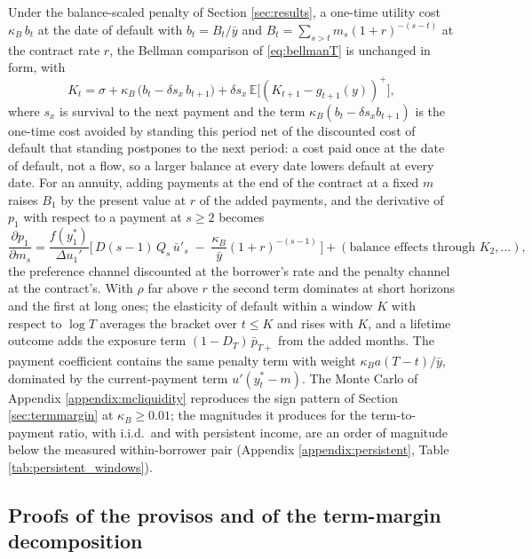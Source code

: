 \documentclass[12pt,english]{article}
\begin{document}
Under the balance-scaled penalty of Section \ref{sec:results}, a one-time utility cost $\kappa_B\, b_t$ at the date of default with $b_t = B_t/\bar y$ and $B_t = \sum_{s>t} m_s (1+r)^{-(s-t)}$ at the contract rate $r$, the Bellman comparison of \eqref{eq:bellmanT} is unchanged in form, with
\begin{equation}
K_t = \sigma + \kappa_B\,\big(b_t - \delta s_x\, b_{t+1}\big) + \delta s_x\,\mathbb{E}\big[(K_{t+1} - g_{t+1}(y))^+\big],
\end{equation}
where $s_x$ is survival to the next payment and the term $\kappa_B(b_t - \delta s_x b_{t+1})$ is the one-time cost avoided by standing this period net of the discounted cost of default that standing postpones to the next period: a cost paid once at the date of default, not a flow, so a larger balance at every date lowers default at every date. For an annuity, adding payments at the end of the contract at a fixed $m$ raises $B_1$ by the present value at $r$ of the added payments, and the derivative of $p_1$ with respect to a payment at $s \ge 2$ becomes
\begin{equation}\label{eq:twochannel}
\frac{\partial p_1}{\partial m_s} = \frac{f(y_1^*)}{\Delta u_1'}\Big[\, D(s-1)\,Q_s\,\bar u'_s \;-\; \frac{\kappa_B}{\bar y}(1+r)^{-(s-1)} \,\Big] + (\text{balance effects through } K_2, \dots),
\end{equation}
the preference channel discounted at the borrower's rate and the penalty channel at the contract's. With $\rho$ far above $r$ the second term dominates at short horizons and the first at long ones; the elasticity of default within a window $K$ with respect to $\log T$ averages the bracket over $t \le K$ and rises with $K$, and a lifetime outcome adds the exposure term $(1-D_T)\,\bar p_{T+}$ from the added months. The payment coefficient contains the same penalty term with weight $\kappa_B a(T-t)/\bar y$, dominated by the current-payment term $u'(y_t^* - m)$. The Monte Carlo of Appendix \ref{appendix:mcliquidity} reproduces the sign pattern of Section \ref{sec:termmargin} at $\kappa_B \ge 0.01$; the magnitudes it produces for the term-to-payment ratio, with i.i.d.\ and with persistent income, are an order of magnitude below the measured within-borrower pair (Appendix \ref{appendix:persistent}, Table \ref{tab:persistent_windows}).

\subsection{Proofs of the provisos and of the term-margin decomposition}\label{appendix:limits}
\end{document}
